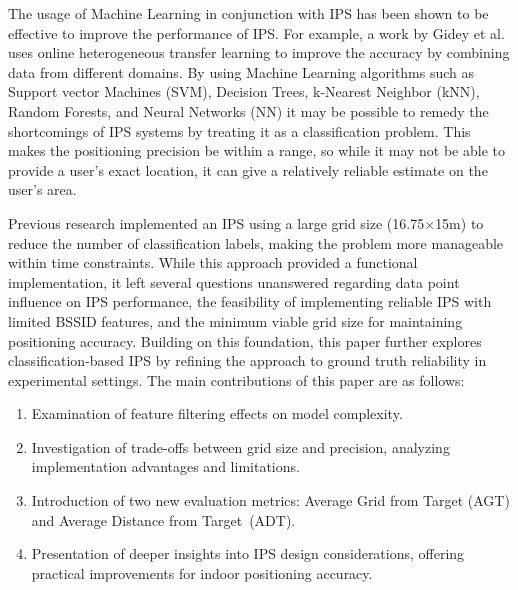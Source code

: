 \documentclass[runningheads]{llncs}
\begin{document}
The usage of Machine Learning in conjunction with IPS has been shown to be effective to improve the performance of IPS. For example, a work by Gidey et al. \cite{bgp3} uses online heterogeneous transfer learning to improve the accuracy by combining data from different domains. By using Machine Learning algorithms such as Support vector Machines (SVM), Decision Trees, k-Nearest Neighbor (kNN), Random Forests, and Neural Networks (NN) it may be possible to remedy the shortcomings of IPS systems by treating it as a classification problem. This makes the positioning precision be within a range, so while it may not be able to provide a user's exact location, it can give a relatively reliable estimate on the user's area.

Previous research implemented an IPS using a large grid size (16.75$\times$15m) to reduce the number of classification labels, making the problem more manageable within time constraints. While this approach provided a functional implementation, it left several questions unanswered regarding data point influence on IPS performance, the feasibility of implementing reliable IPS with limited BSSID features, and the minimum viable grid size for maintaining positioning accuracy.
Building on this foundation, this paper further explores classification-based IPS by refining the approach to ground truth reliability in experimental settings. The main contributions of this paper are as follows:
\begin{enumerate}
	\item Examination of feature filtering effects on model complexity.
	\item Investigation of trade-offs between grid size and precision, analyzing implementation advantages and limitations.
	\item Introduction of two new evaluation metrics: Average Grid from Target (AGT) and Average Distance from Target~(ADT).
	\item Presentation of deeper insights into IPS design considerations, offering practical improvements for indoor positioning accuracy.
\end{enumerate}

\end{document}
